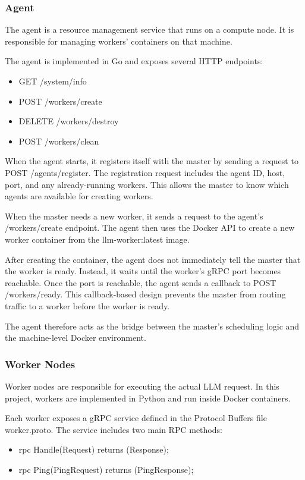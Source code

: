 \subsubsection{Agent}
The agent is a resource management service that runs on a compute node. It is responsible for managing workers' containers on that machine.

The agent is implemented in Go and exposes several HTTP endpoints:
\begin{itemize}[leftmargin=1.5em]
  \item GET /system/info
  \item POST /workers/create
  \item DELETE /workers/destroy
  \item POST /workers/clean
\end{itemize}

When the agent starts, it registers itself with the master by sending a request to POST /agents/register. The registration request includes the agent ID, host, port, and any already-running workers. This allows the master to know which agents are available for creating workers.

When the master needs a new worker, it sends a request to the agent's /workers/create endpoint. The agent then uses the Docker API to create a new worker container from the llm-worker:latest image.

After creating the container, the agent does not immediately tell the master that the worker is ready. Instead, it waits until the worker's gRPC port becomes reachable. Once the port is reachable, the agent sends a callback to POST /workers/ready. This callback-based design prevents the master from routing traffic to a worker before the worker is ready.

The agent therefore acts as the bridge between the master's scheduling logic and the machine-level Docker environment.

\subsubsection{Worker Nodes}
Worker nodes are responsible for executing the actual LLM request. In this project, workers are implemented in Python and run inside Docker containers.

Each worker exposes a gRPC service defined in the Protocol Buffers file worker.proto. The service includes two main RPC methods:
\begin{itemize}[leftmargin=1.5em]
  \item rpc Handle(Request) returns (Response);
  \item rpc Ping(PingRequest) returns (PingResponse);
\end{itemize}

